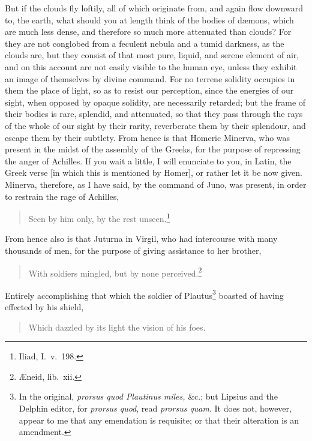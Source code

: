 \documentclass[12pt]{article}
\begin{document}
\noindent But if the clouds fly loftily, all of which originate from, and again
flow downward to, the earth, what should you at length think of the bodies of
d{\ae}mons, which are much less dense, and therefore so much more attenuated
than clouds? For they are not conglobed from a feculent nebula and a tumid
darkness, as the clouds are, but they consist of that most pure, liquid, and
serene element of air, and on this account are not easily visible to the human
eye, unless they exhibit an image of themselves by divine command. For no
terrene solidity occupies in them the place of light, so as to resist our
perception, since the energies of our sight, when opposed by opaque solidity,
are necessarily retarded; but the frame of their bodies is rare, splendid, and
attenuated, so that they pass through the rays of the whole of our sight by
their rarity, reverberate them by their splendour, and escape them by their
subtlety. From hence is that Homeric Minerva, who was present in the midst of
the assembly of the Greeks, for the purpose of repressing the anger of
Achilles. If you wait a little, I will enunciate to you, in Latin, the Greek
verse [in which this is mentioned by Homer], or rather let it be now given.
Minerva, therefore, as I have said, by the command of Juno, was present, in
order to restrain the rage of Achilles,

\begin{verse}
Seen by him only, by the rest unseen.\footnote{Iliad, I.~v.~198.}
\end{verse}

\noindent From hence also is that Juturna in Virgil, who had intercourse
with many thousands of men, for the purpose of
giving assistance to her brother,

\begin{verse}
With soldiers mingled, but by none perceived.\footnote{{\AE}neid, lib.~xii.}
\end{verse}

\noindent Entirely accomplishing that which the soldier of Plautus\footnote{In
the original, \textit{prorsus quod Plautinus miles,} \&c.; but Lipsius and the
Delphin editor, for \textit{prorsus quod}, read \textit{prorsus quam}. It does
not, however, appear to me that any emendation is requisite; or that
their alteration is an amendment.} boasted of having effected by his shield,

\begin{verse}
Which dazzled by its light the vision of his foes.
\end{verse}
\end{document}
